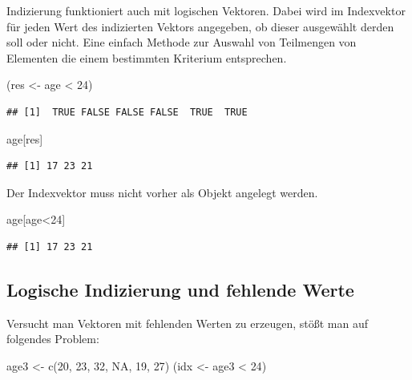 \documentclass[
]{book}
\newenvironment{Shaded}{\begin{snugshade}}{\end{snugshade}}
\newcommand{\ConstantTok}[1]{\textcolor[rgb]{0.00,0.00,0.00}{#1}}
\newcommand{\DecValTok}[1]{\textcolor[rgb]{0.00,0.00,0.81}{#1}}
\newcommand{\FunctionTok}[1]{\textcolor[rgb]{0.00,0.00,0.00}{#1}}
\newcommand{\NormalTok}[1]{#1}
\newcommand{\OtherTok}[1]{\textcolor[rgb]{0.56,0.35,0.01}{#1}}
\newcommand{\SpecialCharTok}[1]{\textcolor[rgb]{0.00,0.00,0.00}{#1}}
\begin{document}
Indizierung funktioniert auch mit logischen Vektoren. Dabei wird im Indexvektor für jeden Wert des indizierten Vektors angegeben, ob dieser ausgewählt derden soll oder nicht.
Eine einfach Methode zur Auswahl von Teilmengen von Elementen die einem bestimmten Kriterium entsprechen.

\begin{Shaded}
\begin{Highlighting}[]
\NormalTok{(res }\OtherTok{\textless{}{-}}\NormalTok{ age }\SpecialCharTok{\textless{}} \DecValTok{24}\NormalTok{)}
\end{Highlighting}
\end{Shaded}

\begin{verbatim}
## [1]  TRUE FALSE FALSE FALSE  TRUE  TRUE
\end{verbatim}

\begin{Shaded}
\begin{Highlighting}[]
\NormalTok{age[res]}
\end{Highlighting}
\end{Shaded}

\begin{verbatim}
## [1] 17 23 21
\end{verbatim}

Der Indexvektor muss nicht vorher als Objekt angelegt werden.

\begin{Shaded}
\begin{Highlighting}[]
\NormalTok{age[age}\SpecialCharTok{\textless{}}\DecValTok{24}\NormalTok{]}
\end{Highlighting}
\end{Shaded}

\begin{verbatim}
## [1] 17 23 21
\end{verbatim}

\hypertarget{logische-indizierung-und-fehlende-werte}{%
\subsection{Logische Indizierung und fehlende Werte}\label{logische-indizierung-und-fehlende-werte}}

Versucht man Vektoren mit fehlenden Werten zu erzeugen, stößt man auf folgendes Problem:

\begin{Shaded}
\begin{Highlighting}[]
\NormalTok{age3 }\OtherTok{\textless{}{-}}  \FunctionTok{c}\NormalTok{(}\DecValTok{20}\NormalTok{, }\DecValTok{23}\NormalTok{, }\DecValTok{32}\NormalTok{, }\ConstantTok{NA}\NormalTok{, }\DecValTok{19}\NormalTok{, }\DecValTok{27}\NormalTok{)}
\NormalTok{(idx }\OtherTok{\textless{}{-}}\NormalTok{ age3 }\SpecialCharTok{\textless{}} \DecValTok{24}\NormalTok{)}
\end{Highlighting}
\end{Shaded}
\end{document}
